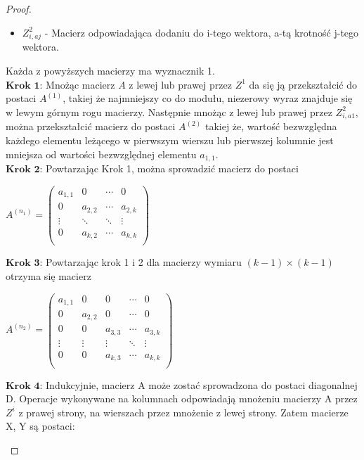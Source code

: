 \begin{proof}
\begin{itemize}
\item $Z^2_{i,aj}$ -  Macierz odpowiadająca dodaniu do  i-tego wektora, a-tą krotność j-tego wektora.
\end{itemize}
Każda z powyższych macierzy ma wyznacznik 1. \\
$\textbf{Krok 1:}$ Mnożąc macierz $A$ z lewej lub prawej przez $Z^1$ da się 
ją przekształcić do postaci $A^{(1)}$, takiej że najmniejszy co do modułu, niezerowy wyraz znajduje się w lewym górnym rogu macierzy. Następnie mnożąc z lewej lub prawej przez 
$Z^2_{i,a1}$, można przekształcić macierz do postaci $A^{(2)}$ takiej że, wartość bezwzględna każdego elementu leżącego w pierwszym wierszu lub pierwszej kolumnie jest mniejsza od wartości bezwzględnej elementu $a_{1,1}$. \\
$\textbf{Krok 2:}$ Powtarzając Krok 1, można sprowadzić macierz do postaci 
\begin{center}
$A^{(n_{1})}=\begin{pmatrix}
a_{1,1} & 0 & \cdots & 0 \\
0 & a_{2,2} & \cdots & a_{2,k} \\
\vdots & \ddots & \ddots & \vdots \\
0 & a_{k,2} & \cdots & a_{k,k} \\
\end{pmatrix}$
\end{center}
$\textbf{Krok 3:}$ Powtarzając krok 1 i 2 dla macierzy wymiaru $(k-1) \times (k-1)$ otrzyma się macierz 
\begin{center}
$A^{(n_{2})}=\begin{pmatrix}
a_{1,1} & 0 & 0 & \cdots & 0 \\
0 & a_{2,2} & 0 & \cdots & 0 \\
0 & 0 & a_{3,3} & \cdots & a_{3,k} \\
\vdots & \vdots & \vdots & \ddots  & \vdots \\
0 & 0 & a_{k,3} & \cdots & a_{k,k} \\
\end{pmatrix}$ \\
\end{center}
$\textbf{Krok 4:}$ Indukcyjnie, macierz A może zostać sprowadzona do postaci diagonalnej D. Operacje wykonywane na kolumnach odpowiadają mnożeniu macierzy A przez $Z^i$ z prawej strony, na wierszach przez mnożenie z lewej strony. Zatem macierze X, Y są postaci: \\

	\begin{minipage}{0.5\textwidth}
	\begin{center}
	

\end{center}
\end{minipage}
\end{proof}
